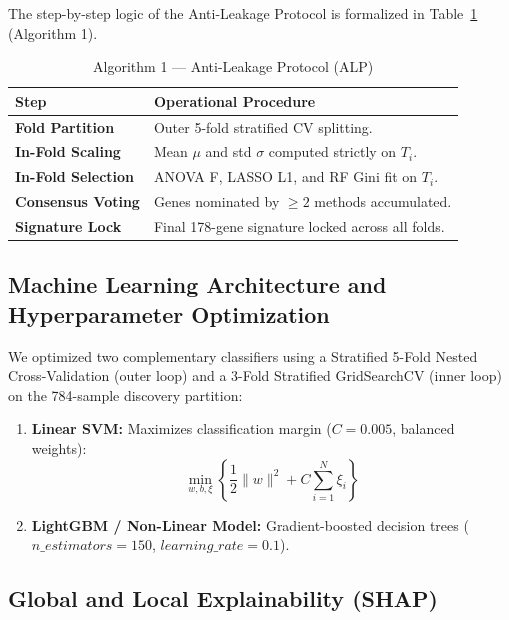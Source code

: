 \documentclass[10pt,a4paper,twocolumn]{article}
\renewcommand{\arraystretch}{1.2}
\begin{document}
The step-by-step logic of the Anti-Leakage Protocol is formalized in Table~\ref{tab:alp_algorithm} (Algorithm 1).

\begin{table}[htbp]
\centering
\caption{Algorithm 1 --- Anti-Leakage Protocol (ALP)}
\label{tab:alp_algorithm}
\small
\renewcommand{\arraystretch}{1.2}

\begin{tabularx}{\columnwidth}{
  >{\bfseries\RaggedRight\arraybackslash}p{2.1cm}
  >{\RaggedRight\arraybackslash}X
}
\toprule

\normalfont\textbf{Step} & 
\textbf{Operational Procedure} \\

\midrule

Fold Partition & Outer 5-fold stratified CV splitting. \\
In-Fold Scaling & Mean $\mu$ and std $\sigma$ computed strictly on $T_i$. \\
In-Fold Selection & ANOVA F, LASSO L1, and RF Gini fit on $T_i$. \\
Consensus Voting & Genes nominated by $\ge 2$ methods accumulated. \\
Signature Lock & Final 178-gene signature locked across all folds. \\

\bottomrule
\end{tabularx}
\end{table}

\subsection{Machine Learning Architecture and Hyperparameter Optimization}
We optimized two complementary classifiers using a Stratified 5-Fold Nested Cross-Validation (outer loop) and a 3-Fold Stratified GridSearchCV (inner loop) on the 784-sample discovery partition: 

\begin{enumerate}
    \item \textbf{Linear SVM:} Maximizes classification margin ($C = 0.005$, balanced weights):
    $$\min_{w,b,\xi} \left\{ \frac{1}{2} \| w \|^2 + C \sum_{i=1}^{N} \xi_i \right\}$$
    
    \item \textbf{LightGBM / Non-Linear Model:} Gradient-boosted decision trees ($n\_estimators = 150$, $learning\_rate = 0.1$).
\end{enumerate}

\subsection{Global and Local Explainability (SHAP)}
\end{document}
